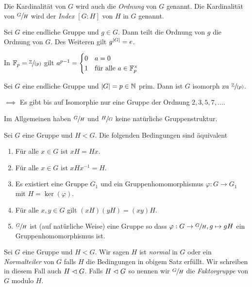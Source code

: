\begin{definition}
	Die Kardinalität von $G$ wird auch die \emph{Ordnung} von $G$ genannt.
	Die Kardinalität von $\sfrac{G}{H}$ wird der \emph{Index $[G:H]$} von $H$ in $G$ genannt.
\end{definition}


\begin{corollary}
	Sei $G$ eine endliche Gruppe und $g \in G$. Dann teilt die Ordnung von $g$ die Ordnung von $G$.
	Des Weiteren gilt $g^{\abs{G}} = e$.
\end{corollary}


\begin{corollary}
	In $\mathbb{F}_{p} = \sfrac{\mathbb{Z}}{(p)}$ gilt $a^{p-1} = \begin{cases}
		0 &a = 0\\
		1 &\text{für alle } a \in \mathbb{F}_{p}^{\times}
	\end{cases}$
\end{corollary}


\begin{corollary}
	Sei $G$ eine endliche Gruppe und $\abs{G} = p \in \mathbb{N}$ prim. Dann ist $G$ isomorph zu $\sfrac{\mathbb{Z}}{(p)}$.
\end{corollary}


$\implies$ Es gibt bis auf Isomorphie nur eine Gruppe der Ordnung $2,3,5,7,\ldots$.

Im Allgemeinen haben $\sfrac{G}{H}$ und $\sfrac{H}{G}$ keine natürliche Gruppenstruktur.

\begin{theorem}
	Sei $G$ eine Gruppe und $H < G$. Die folgenden Bedingungen sind äquivalent
	\begin{enumerate}[(1)]
		\item Für alle $x \in G$ ist $x H = H x$.
		\item Für alle  $x \in G$ ist $x H x^{-1} = H$.
		\item Es existiert eine Gruppe $G_1$ und ein Gruppenhomomorphismus $\varphi: G \to G_1$ mit $H = \ker(\varphi)$.
		\item Für alle $x,y \in G$ gilt $(xH)(yH) = (xy) H$.
		\item $\sfrac{G}{H}$ ist (auf natürliche Weise) eine Gruppe so dass $\varphi: G \to \sfrac{G}{H}, g \mapsto g H$ ein Gruppenhomomorphismus ist.
	\end{enumerate}
\end{theorem}


\begin{definition}
	Sei $G$ eine Gruppe und $H < G$.
	Wir sagen $H$ ist \emph{normal} in $G$ oder ein \emph{Normalteiler} von $G$ falls $H$ die Bedingungen in obigem Satz erfüllt.
	Wir schreiben in diesem Fall auch $H \vartriangleleft G$.
	Falls $H \vartriangleleft G$ so nennen wir $\sfrac{G}{H}$ die \emph{Faktorgruppe} von $G$ modulo $H$.
\end{definition}

